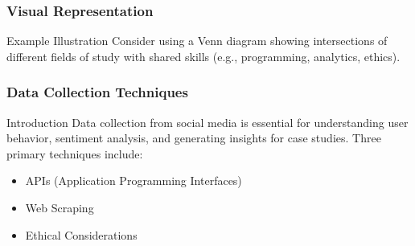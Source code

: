 \documentclass{beamer}
\begin{document}
\begin{frame}[fragile]
    \frametitle{Visual Representation}
    \begin{block}{Example Illustration}
        Consider using a Venn diagram showing intersections of different fields of study with shared skills (e.g., programming, analytics, ethics).
    \end{block}
\end{frame}

\begin{frame}
    \frametitle{Data Collection Techniques}
    \begin{block}{Introduction}
        Data collection from social media is essential for understanding user behavior, sentiment analysis, and generating insights for case studies. 
        Three primary techniques include:
        \begin{itemize}
            \item APIs (Application Programming Interfaces)
            \item Web Scraping
            \item Ethical Considerations
        \end{itemize}
    \end{block}
\end{frame}
\end{document}
